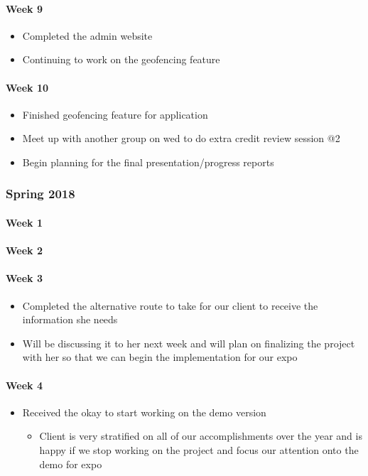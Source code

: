 \documentclass[onecolumn, draftclsnofoot,10pt, compsoc]{IEEEtran}
\begin{document}
      \paragraph{Week 9}
        \begin{itemize}
          \item Completed the admin website
          \item Continuing to work on the geofencing feature
        \end{itemize}

      \paragraph{Week 10}
        \begin{itemize}
          \item Finished geofencing feature for application
          \item Meet up with another group on wed to do extra credit review session @2
          \item Begin planning for the final presentation/progress reports
        \end{itemize}

    \subsubsection{Spring 2018}
      \paragraph{Week 1}
      \paragraph{Week 2}
      \paragraph{Week 3}
        \begin{itemize}
          \item Completed the alternative route to take for our client to receive the information she needs
          \item Will be discussing it to her next week and will plan on finalizing the project with her so that we can begin the implementation for our expo
        \end{itemize}

      \paragraph{Week 4}
        \begin{itemize}
          \item Received the okay to start working on the demo version
            \begin{itemize}
              \item Client is very stratified on all of our accomplishments over the year and is happy if we stop working on the project and focus our attention onto the demo for expo
          \end{itemize}
        \end{itemize}
\end{document}
